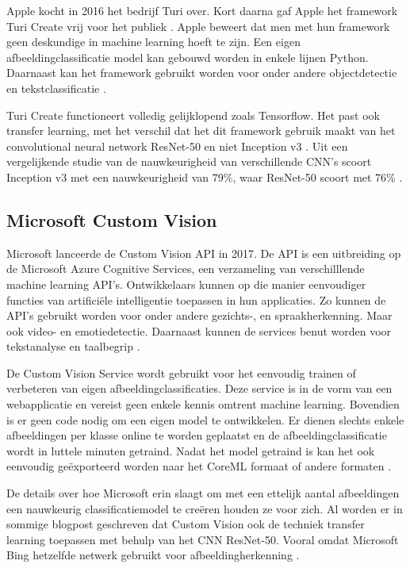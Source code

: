 Apple kocht in 2016 het bedrijf Turi over. Kort daarna gaf Apple het framework Turi Create vrij voor het publiek \autocite{9to5}. Apple beweert dat men met hun framework geen deskundige in machine learning hoeft te zijn. Een eigen afbeeldingclassificatie model kan gebouwd worden in enkele lijnen Python. Daarnaast kan het framework gebruikt worden voor onder andere objectdetectie en tekstclassificatie \autocite{githubturi}.

Turi Create functioneert volledig gelijklopend zoals Tensorflow. Het past ook transfer learning, met het verschil dat het dit framework gebruik maakt van het convolutional neural network ResNet-50 en niet Inception v3 \autocite{hackermoon}. Uit een vergelijkende studie van de nauwkeurigheid van verschillende \acrshort{CNN}’s scoort Inception v3 met een nauwkeurigheid van 79\%, waar ResNet-50 scoort met 76\% \autocite{arxiv}.

\subsection{Microsoft Custom Vision}
\label{ssec:Microsoft Custom Vision}

Microsoft lanceerde de Custom Vision API in 2017. De \acrshort{API} is een uitbreiding op de Microsoft Azure Cognitive Services, een verzameling van verschilllende machine learning \acrshort{API}’s. Ontwikkelaars kunnen op die manier eenvoudiger functies van artificiële intelligentie toepassen in hun applicaties. Zo kunnen de \acrshort{API}’s gebruikt worden voor onder andere gezichts-, en spraakherkenning. Maar ook video- en emotiedetectie. Daarnaast kunnen de services benut worden voor tekstanalyse en taalbegrip \autocite{cognitiveservices}.

De Custom Vision Service wordt gebruikt voor het eenvoudig trainen of verbeteren van eigen afbeeldingclassificaties. Deze service is in de vorm van een webapplicatie en vereist geen enkele kennis omtrent machine learning. Bovendien is er geen code nodig om een eigen model te ontwikkelen. Er dienen slechts enkele afbeeldingen per klasse online te worden geplaatst en de afbeeldingclassificatie wordt in luttele minuten getraind. Nadat het model getraind is kan het ook eenvoudig geëxporteerd worden naar het CoreML formaat of andere formaten \autocite{appliedies}.

De details over hoe Microsoft erin slaagt om met een ettelijk aantal afbeeldingen een nauwkeurig classificatiemodel te creëren houden ze voor zich. Al worden er in sommige blogpost geschreven dat Custom Vision ook de techniek transfer learning toepassen met behulp van het \acrshort{CNN} ResNet-50. Vooral omdat Microsoft Bing hetzelfde netwerk gebruikt voor afbeeldingherkenning \autocite{praeclarum}.







